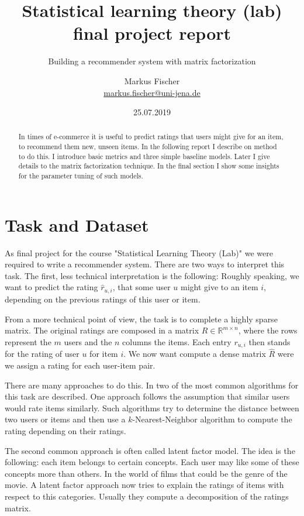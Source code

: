 \documentclass[DIV=14,twocolumn]{scrartcl}
\title{Statistical learning theory (lab) final project report}
\subtitle{Building a recommender system with matrix factorization}
\author{Markus Fischer\\ \small{\href{mailto:markus.fischer@uni-jena.de}{markus.fischer@uni-jena.de}}}
\date{25.07.2019}
\begin{document}
\maketitle
\begin{abstract}
In times of e-commerce it is useful to predict ratings that  users might give for an item, to recommend them new, unseen items. In the following report I describe on method to do this. I introduce basic metrics and three simple baseline models. Later I give details to the matrix factorization technique. In the final section I show some insights for the parameter tuning of such models.
\end{abstract}

\section{Task and Dataset}\label{intro}
As final project for the course "Statistical Learning Theory (Lab)" we were required to write a recommender system. There are two ways to interpret this task.
The first, less technical interpretation is the following: Roughly speaking, we want to predict the rating $\hat{r}_{u,i}$, that some user $u$ might give to an item $i$, depending on the previous ratings of this user or item.

From a more technical point of view, the task is to complete a highly sparse matrix. The original ratings are composed in a matrix $R\in\mathbb{R}^{m\times n}$, where the rows represent the $m$ users and the $n$ columns the items.
Each entry $r_{u,i}$ then stands for the rating of user $u$ for item $i$. We now want compute a dense matrix $\hat{R}$ were we assign a rating for each user-item pair.

There are many approaches to do this. In \cite{KoBeVo09} two of the most common algorithms for this task are described.
One approach follows the assumption that similar users would rate items similarly. Such algorithms try to determine the distance between two users or items and then use a $k$-Nearest-Neighbor algorithm to compute the rating depending on their ratings.

The second common approach is often called latent factor model. The idea is the following: each item belongs to certain concepts. Each user may like some of these concepts more than others. In the world of films that could be the genre of the movie. A latent factor approach now tries to explain the ratings of items with respect to this categories. Usually they compute a decomposition of the ratings matrix.
\end{document}

